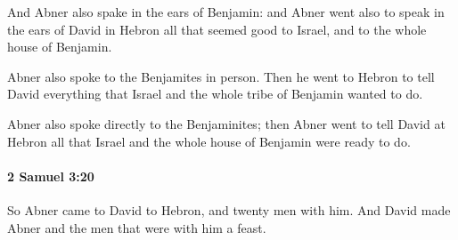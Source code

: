 			\begin{versebox}
					\item[BHS] 
					\item[ASV] And Abner also spake in the ears of Benjamin: and Abner went also to speak in the ears of David in Hebron all that seemed good to Israel, and to the whole house of Benjamin.
					\item[NIV] Abner also spoke to the Benjamites in person. Then he went to Hebron to tell David everything that Israel and the whole tribe of Benjamin wanted to do.
					\item[NRSV] Abner also spoke directly to the Benjaminites; then Abner went to tell David at Hebron all that Israel and the whole house of Benjamin were ready to do.
			\end{versebox}

		\paragraph{2 Samuel 3:20} %
			\label{2SAMUEL-3-20}

			So Abner came to David to Hebron, and twenty men with him. And David made Abner and the men that were with him a feast.

